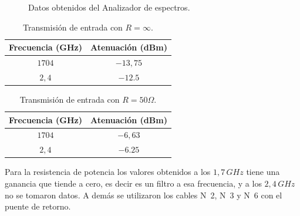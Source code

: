 \documentclass[12pt,graphicx,caption,rotating]{article}
\begin{document}
\begin{figure}[H]
\begin{subfigure}
  \end{subfigure}
  \caption{Datos obtenidos del Analizador de espectros.}
  \label{fig04}
\end{figure}

\begin{table}[H]
  \centering
  \caption{Transmisión de entrada con $R = \infty$.}
    \begin{tabular}{|c|c|}\hline
      \textbf{Frecuencia (GHz) } & \textbf{Atenuación (dBm) } \\ \hline
      $1704$ & $−13,75 $ \\ \hline
      $2,4 $ & $−12.5 $ \\ \hline
    \end{tabular}
  \label{tab9}
\end{table}

\begin{table}[H]
  \centering
  \caption{Transmisión de entrada con $R = 50 \Omega$.}
    \begin{tabular}{|c|c|}\hline
      \textbf{Frecuencia (GHz) } & \textbf{Atenuación (dBm) } \\ \hline
      $1704$ & $−6,63 $ \\ \hline
      $2,4 $ & $−6.25 $ \\ \hline
    \end{tabular}
  \label{tab10}
\end{table}
\noindent
Para la resistencia de potencia los valores obtenidos a los $1,7\, GHz$ tiene una ganancia que tiende a cero, es decir es un filtro a esa frecuencia, y a los $2,4\, GHz$ no se tomaron datos. A demás se utilizaron los cables N~2, N~3 y N~6 con el puente de retorno.
\end{document}
